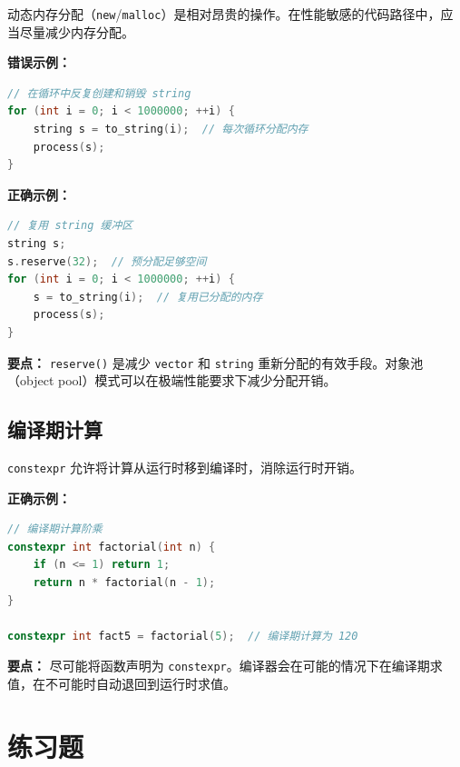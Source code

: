 动态内存分配（\texttt{new}/\allowbreak{}\texttt{malloc}）是相对昂贵的操作。在性能敏感的代码路径中，应当尽量减少内存分配。

\textbf{错误示例：}

\begin{lstlisting}[language=C++]
// 在循环中反复创建和销毁 string
for (int i = 0; i < 1000000; ++i) {
    string s = to_string(i);  // 每次循环分配内存
    process(s);
}
\end{lstlisting}

\textbf{正确示例：}

\begin{lstlisting}[language=C++]
// 复用 string 缓冲区
string s;
s.reserve(32);  // 预分配足够空间
for (int i = 0; i < 1000000; ++i) {
    s = to_string(i);  // 复用已分配的内存
    process(s);
}
\end{lstlisting}

\textbf{要点：} \texttt{reserve()} 是减少 \texttt{vector} 和 \texttt{string} 重新分配的有效手段。对象池（object pool）模式可以在极端性能要求下减少分配开销。

\subsection*{编译期计算}

\texttt{constexpr} 允许将计算从运行时移到编译时，消除运行时开销。

\textbf{正确示例：}

\begin{lstlisting}[language=C++]
// 编译期计算阶乘
constexpr int factorial(int n) {
    if (n <= 1) return 1;
    return n * factorial(n - 1);
}

constexpr int fact5 = factorial(5);  // 编译期计算为 120
\end{lstlisting}

\textbf{要点：} 尽可能将函数声明为 \texttt{constexpr}。编译器会在可能的情况下在编译期求值，在不可能时自动退回到运行时求值。

\section*{练习题}


